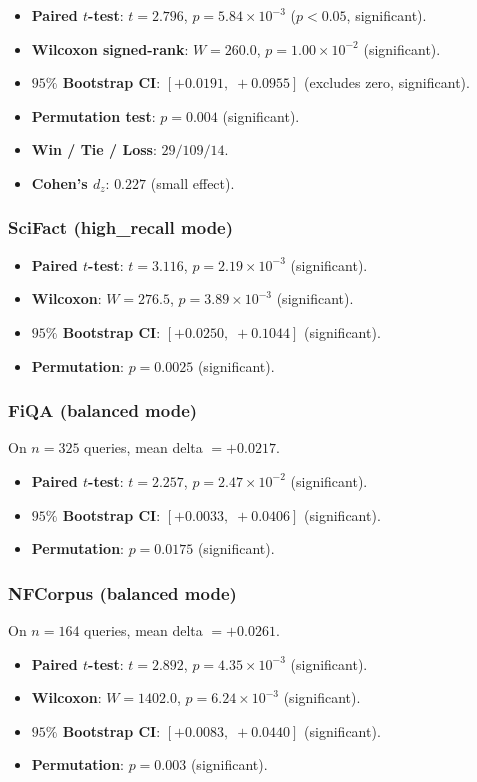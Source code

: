 \documentclass[journal]{IEEEtran}
\begin{document}
\begin{itemize}
  \item \textbf{Paired $t$-test}: $t = 2.796$,
        $p = 5.84 \times 10^{-3}$ ($p < 0.05$, significant).
  \item \textbf{Wilcoxon signed-rank}: $W = 260.0$,
        $p = 1.00 \times 10^{-2}$ (significant).
  \item \textbf{$95\%$ Bootstrap CI}: $[+0.0191,\; +0.0955]$
        (excludes zero, significant).
  \item \textbf{Permutation test}: $p = 0.004$ (significant).
  \item \textbf{Win / Tie / Loss}: $29 / 109 / 14$.
  \item \textbf{Cohen's $d_z$}: $0.227$ (small effect).
\end{itemize}

\subsubsection{SciFact (high\_recall mode)}
\begin{itemize}
  \item \textbf{Paired $t$-test}: $t = 3.116$,
        $p = 2.19 \times 10^{-3}$ (significant).
  \item \textbf{Wilcoxon}: $W = 276.5$, $p = 3.89 \times 10^{-3}$ (significant).
  \item \textbf{$95\%$ Bootstrap CI}: $[+0.0250,\; +0.1044]$ (significant).
  \item \textbf{Permutation}: $p = 0.0025$ (significant).
\end{itemize}

\subsubsection{FiQA (balanced mode)}
On $n = 325$ queries, mean delta $= +0.0217$.
\begin{itemize}
  \item \textbf{Paired $t$-test}: $t = 2.257$,
        $p = 2.47 \times 10^{-2}$ (significant).
  \item \textbf{$95\%$ Bootstrap CI}: $[+0.0033,\; +0.0406]$ (significant).
  \item \textbf{Permutation}: $p = 0.0175$ (significant).
\end{itemize}

\subsubsection{NFCorpus (balanced mode)}
On $n = 164$ queries, mean delta $= +0.0261$.
\begin{itemize}
  \item \textbf{Paired $t$-test}: $t = 2.892$,
        $p = 4.35 \times 10^{-3}$ (significant).
  \item \textbf{Wilcoxon}: $W = 1402.0$,
        $p = 6.24 \times 10^{-3}$ (significant).
  \item \textbf{$95\%$ Bootstrap CI}: $[+0.0083,\; +0.0440]$ (significant).
  \item \textbf{Permutation}: $p = 0.003$ (significant).
\end{itemize}
\end{document}
